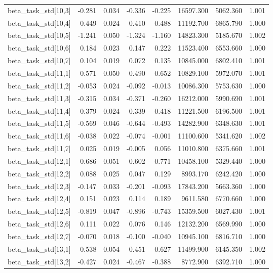 \begin{tabular}{lrrrrrrr}
beta\_task\_std[10,3] & -0.281 & 0.034 & -0.336 & -0.225 & 16597.300 & 5062.360 & 1.001 \\
beta\_task\_std[10,4] & 0.449 & 0.024 & 0.410 & 0.488 & 11192.700 & 6865.790 & 1.000 \\
beta\_task\_std[10,5] & -1.241 & 0.050 & -1.324 & -1.160 & 14823.300 & 5185.670 & 1.002 \\
beta\_task\_std[10,6] & 0.184 & 0.023 & 0.147 & 0.222 & 11523.400 & 6553.660 & 1.000 \\
beta\_task\_std[10,7] & 0.104 & 0.019 & 0.072 & 0.135 & 10845.000 & 6802.410 & 1.001 \\
beta\_task\_std[11,1] & 0.571 & 0.050 & 0.490 & 0.652 & 10829.100 & 5972.070 & 1.001 \\
beta\_task\_std[11,2] & -0.053 & 0.024 & -0.092 & -0.013 & 10086.300 & 5753.630 & 1.000 \\
beta\_task\_std[11,3] & -0.315 & 0.034 & -0.371 & -0.260 & 16212.000 & 5990.690 & 1.001 \\
beta\_task\_std[11,4] & 0.379 & 0.024 & 0.339 & 0.418 & 11221.500 & 6196.500 & 1.001 \\
beta\_task\_std[11,5] & -0.569 & 0.046 & -0.644 & -0.493 & 14282.900 & 6348.630 & 1.001 \\
beta\_task\_std[11,6] & -0.038 & 0.022 & -0.074 & -0.001 & 11100.600 & 5341.620 & 1.002 \\
beta\_task\_std[11,7] & 0.025 & 0.019 & -0.005 & 0.056 & 11010.800 & 6375.660 & 1.001 \\
beta\_task\_std[12,1] & 0.686 & 0.051 & 0.602 & 0.771 & 10458.100 & 5329.440 & 1.000 \\
beta\_task\_std[12,2] & 0.088 & 0.025 & 0.047 & 0.129 & 8993.170 & 6242.420 & 1.000 \\
beta\_task\_std[12,3] & -0.147 & 0.033 & -0.201 & -0.093 & 17843.200 & 5663.360 & 1.000 \\
beta\_task\_std[12,4] & 0.151 & 0.023 & 0.114 & 0.189 & 9611.580 & 6770.660 & 1.000 \\
beta\_task\_std[12,5] & -0.819 & 0.047 & -0.896 & -0.743 & 15359.500 & 6027.430 & 1.001 \\
beta\_task\_std[12,6] & 0.111 & 0.022 & 0.076 & 0.146 & 12132.200 & 6569.990 & 1.000 \\
beta\_task\_std[12,7] & -0.070 & 0.018 & -0.100 & -0.040 & 10945.100 & 6816.710 & 1.000 \\
beta\_task\_std[13,1] & 0.538 & 0.054 & 0.451 & 0.627 & 11499.900 & 6145.350 & 1.002 \\
beta\_task\_std[13,2] & -0.427 & 0.024 & -0.467 & -0.388 & 8772.900 & 6392.710 & 1.000 \\

\end{tabular}
